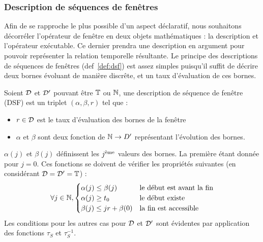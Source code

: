 %
\subsubsection{Description de séquences de fenêtres}
Afin de se rapproche le plus possible d'un aspect déclaratif, nous souhaitons décorréler l'opérateur de fenêtre en deux objets mathématiques : la description et l'opérateur exécutable. Ce dernier prendra une description en argument pour pouvoir représenter la relation temporelle résultante. Le principe des descriptions de séquences de fenêtres (def~\ref{def:dsf}) est assez simples puisqu'il suffit de décrire deux bornes évoluant de manière discrête, et un taux d'évaluation de ces bornes.

\begin{defi}\label{def:dsf}
    Soient $\mathcal{D}$ et $\mathcal{D}'$ pouvant être $\mathbb{T}$ ou $\mathbb{N}$, une description de séquence de fenêtre (DSF) est un triplet $(\alpha,\beta,r)$ tel que :
\begin{itemize}
    \item $r \in \mathcal{D}$ est le taux d'évaluation des bornes de la fenêtre
    \item $\alpha$ et $\beta$ sont deux fonction de $\mathbb{N}\to D'$ représentant l'évolution des bornes.
\end{itemize}

$\alpha(j)$ et $\beta(j)$ définissent les $j^{\textrm{\`{e}me}}$ valeurs des bornes. La première étant donnée pour $j=0$. Ces fonctions se doivent de vérifier les propriétés suivantes (en considérant $\mathcal{D}=\mathcal{D}'=\mathbb{T}$) :
$$\forall j \in \mathbb{N}, \begin{cases} \alpha(j) \leq \beta(j) & \textrm{le début est avant la fin}\\ \alpha(j) \geq t_0 & \textrm{le début existe} \\ \beta(j) \leq jr + \beta(0) & \textrm{la fin est accessible} \end{cases}$$
    Les conditions pour les autres cas pour $\mathcal{D}$ et $\mathcal{D}'$ sont évidentes par application des fonctions $\tau_S$ et $\tau_S^{-1}$.
\end{defi}

